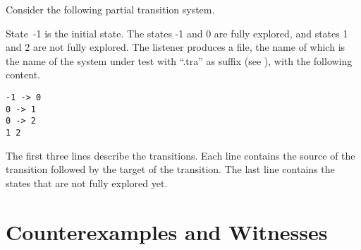 \documentclass[12pt]{article}
\theoremstyle{definition}
\newenvironment{franck}{\color{red}}{\color{black}}
\begin{document}
Consider the following partial transition system.
\begin{center}
\end{center}
State~-1 is the initial state.  The states -1 and 0 are fully explored, and  states 1 and 2 are not fully explored.  The listener produces a file, the name of which is the name of the system under test with ``.tra'' as suffix (see \cite[Section 7.4]{B20}), with the following content.
\begin{verbatim}
-1 -> 0
0 -> 1
0 -> 2
1 2
\end{verbatim}
The first three lines describe the transitions.  Each line contains the source of the transition followed by the target of the transition.  The last line contains the states that are not fully explored yet.

\begin{franck}
\section{Counterexamples and Witnesses}


\end{franck}





\end{document}

